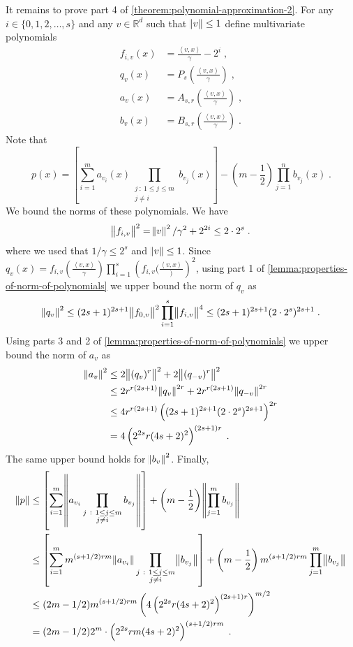 \documentclass[12pt]{article}
\newcommand{\R}{\mathbb{R}}  %
\newcommand{\ip}[2]{\left\langle #1, #2 \right\rangle} %
\begin{document}
It remains to prove part 4 of \autoref{theorem:polynomial-approximation-2}.
For any $i \in \{0,1,2,\dots,s\}$ and any $v \in \R^d$ such that $\norm{v} \le 1$
define multivariate polynomials
\begin{align*}
f_{i,v}(x) & = \frac{\ip{v}{x}}{\gamma} - 2^i \; , \\
q_v(x) & = P_s \left( \frac{\ip{v}{x}}{\gamma} \right) \; , \\
a_v(x) & = A_{s,r} \left( \frac{\ip{v}{x}}{\gamma} \right) \; , \\
b_v(x) & = B_{s,r} \left( \frac{\ip{v}{x}}{\gamma} \right) \; .
\end{align*}
Note that
$$
p(x) = \left[ \sum_{i=1}^m a_{v_i}(x) \prod_{\substack{j ~:~ 1 \le j \le m \\ j \neq i}} b_{v_j}(x) \right] - \left(m - \frac{1}{2} \right) \prod_{j=1}^n b_{v_j}(x) \; .
$$
We bound the norms of these polynomials. We have
$$
\norm{f_{i,v}}^2 = \norm{v}^2/\gamma^2 + 2^{2i} \le 2 \cdot 2^s \; .
$$
where we used that $1/\gamma \le 2^s$ and $\norm{v} \le 1$.
Since $q_v(x) = f_{i,v}(\frac{\ip{v}{x}}{\gamma}) \prod_{i=1}^s \left(f_{i,v}(\frac{\ip{v}{x}})\right)^2$,
using part 1 of \autoref{lemma:properties-of-norm-of-polynomials} we upper bound the norm of $q_v$
as
$$
\norm{q_v}^2 \le (2s+1)^{2s+1} \norm{f_{0,v}}^2 \prod_{i=1}^s \norm{f_{i,v}}^4 \le  (2s+1)^{2s+1} (2 \cdot 2^s)^{2s + 1} \; .
$$
Using parts 3 and 2 of \autoref{lemma:properties-of-norm-of-polynomials} we upper bound the norm of $a_v$ as
\begin{align*}
\norm{a_v}^2
& \le 2\norm{(q_v)^r}^2 + 2\norm{(q_{-v})^r}^2 \\
& \le 2 r^{r(2s+1)} \norm{q_v}^{2r} + 2 r^{r(2s+1)} \norm{q_{-v}}^{2r} \\
& \le 4 r^{r(2s+1)} \left((2s+1)^{2s+1} (2 \cdot 2^s)^{2s + 1} \right)^{2r} \\
& = 4 \left(2^{2s} r (4s+2)^2 \right)^{(2s+1)r} \; .
\end{align*}
The same upper bound holds for $\norm{b_v}^2$. Finally,
\begin{align*}
\norm{p}
& \le \left[ \sum_{i=1}^m \norm{a_{v_i} \prod_{\substack{j ~:~ 1 \le j \le m \\ j \neq i}} b_{v_j}} \right] + \left(m - \frac{1}{2} \right) \norm{\prod_{j=1}^m b_{v_j}} \\
& \le \left[ \sum_{i=1}^m m^{(s+1/2)rm} \norm{a_{v_i}} \prod_{\substack{j ~:~ 1 \le j \le m \\ j \neq i}} \norm{b_{v_j}} \right] + \left(m - \frac{1}{2} \right) m^{(s+1/2)rm} \prod_{j=1}^m \norm{b_{v_j}} \\
& \le (2m-1/2) m^{(s+1/2)rm} \left(4 \left(2^{2s} r (4s+2)^2 \right)^{(2s+1)r} \right)^{m/2} \\
& = (2m-1/2) 2^m \cdot \left(2^{2s} rm (4s+2)^2 \right)^{(s+1/2)rm} \; .
\end{align*}
\end{document}
